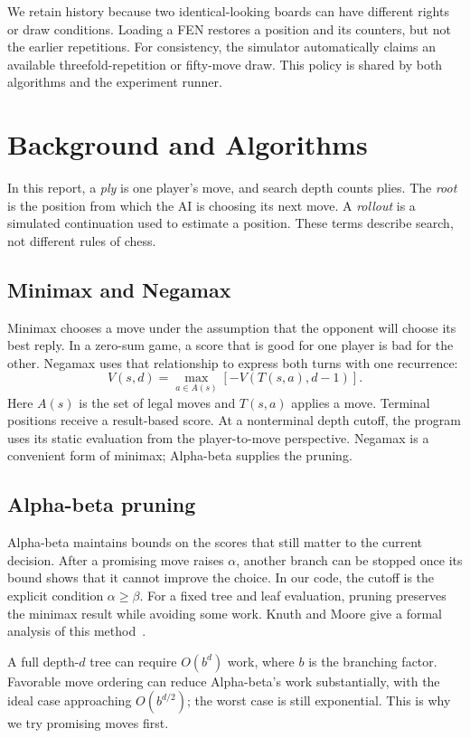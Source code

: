 \documentclass[oneside,final]{hcmut-report}
\begin{document}
We retain history because two identical-looking boards can have different
rights or draw conditions. Loading a FEN restores a position and its counters,
but not the earlier repetitions. For consistency, the simulator automatically
claims an available threefold-repetition or fifty-move draw. This policy is
shared by both algorithms and the experiment runner.

\section{Background and Algorithms}
In this report, a \emph{ply} is one player's move, and search depth counts
plies. The \emph{root} is the position from which the AI is choosing its next
move. A \emph{rollout} is a simulated continuation used to estimate a position.
These terms describe search, not different rules of chess.

\subsection{Minimax and Negamax}
Minimax chooses a move under the assumption that the opponent will choose
its best reply. In a zero-sum game, a score that is good for one player is bad
for the other. Negamax uses that relationship to express both turns with one
recurrence:
\[
 V(s,d)=\max_{a\in A(s)}\left[-V(T(s,a),d-1)\right].
\]
Here $A(s)$ is the set of legal moves and $T(s,a)$ applies a move. Terminal
positions receive a result-based score. At a nonterminal depth cutoff, the
program uses its static evaluation from the player-to-move perspective.
Negamax is a convenient form of minimax; Alpha-beta supplies the pruning.

\subsection{Alpha-beta pruning}
Alpha-beta maintains bounds on the scores that still matter to the current
decision. After a promising move raises $\alpha$, another branch can be stopped
once its bound shows that it cannot improve the choice. In our code, the
cutoff is the explicit condition $\alpha\geq\beta$. For a fixed tree and
leaf evaluation, pruning preserves the minimax result while avoiding some
work. Knuth and Moore give a formal analysis of this method~\cite{knuthmoore}.

A full depth-$d$ tree can require $O(b^d)$ work, where $b$ is the branching
factor. Favorable move ordering can reduce Alpha-beta's work substantially,
with the ideal case approaching $O(b^{d/2})$; the worst case is still
exponential. This is why we try promising moves first.
\end{document}
